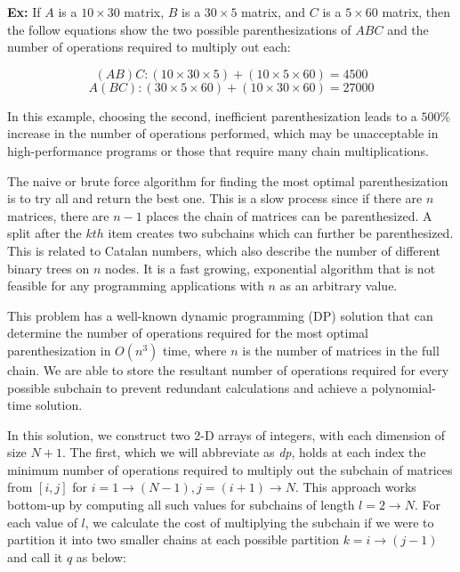 \documentclass[conference,leqno]{IEEEtran}
\begin{document}
\textbf{Ex:} If $A$ is a $10\times30$ matrix, $B$ is a $30\times5$ matrix, and $C$ is a $5\times60$ matrix, then the follow equations show the two possible parenthesizations of $ABC$ and the number of operations required to multiply out each:

\begin{equation}
(AB)C: (10\times30\times5) + (10\times5\times60) = 4500
\end{equation}
\begin{equation}
A(BC): (30\times5\times60) + (10\times30\times60) = 27000
\end{equation}
\vspace{.1cm}

In this example, choosing the second, inefficient parenthesization leads to a $500\%$ increase in the number of operations performed, which may be unacceptable in high-performance programs or those that require many chain multiplications.

The naive or brute force algorithm for finding the most optimal parenthesization is to try all and return the best one. This is a slow process since if there are $n$ matrices, there are $n-1$ places the chain of matrices can be parenthesized. A split after the $kth$ item creates two subchains which can further be parenthesized. This is related to Catalan numbers, which also describe the number of different binary trees on $n$ nodes. It is a fast growing, exponential algorithm that is not feasible for any programming applications with $n$ as an arbitrary value.

This problem has a well-known dynamic programming (DP) solution that can determine the number of operations required for the most optimal parenthesization in $O(n^3)$ time, where $n$ is the number of matrices in the full chain. We are able to store the resultant number of operations required for every possible subchain to prevent redundant calculations and achieve a polynomial-time solution.

In this solution, we construct two 2-D arrays of integers, with each dimension of size $N+1$. The first, which we will abbreviate as \emph{dp}, holds at each index the minimum number of operations required to multiply out the subchain of matrices from $[i, j]$ for $i = 1 \rightarrow (N - 1), j = (i + 1) \rightarrow N$. This approach works bottom-up by computing all such values for subchains of length $l = 2 \rightarrow N$. For each value of $l$, we calculate the cost of multiplying the subchain if we were to partition it into two smaller chains at each possible partition $k = i \rightarrow (j - 1)$ and call it $q$ as below:
\end{document}
